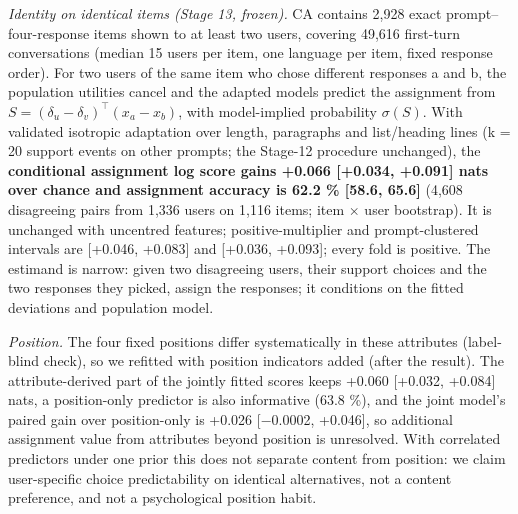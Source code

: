 \documentclass{article}
\begin{document}
\emph{Identity on identical items (Stage 13, frozen).} CA contains 2,928 exact prompt--four-response items shown to at least two users, covering 49,616 first-turn conversations (median 15 users per item, one language per item, fixed response order). For two users of the same item who chose different responses a and b, the population utilities cancel and the adapted models predict the assignment from \(S = (\delta_u - \delta_v)^\top (x_a - x_b)\), with model-implied probability \(\sigma(S)\). With validated isotropic adaptation over length, paragraphs and list/heading lines (k = 20 support events on other prompts; the Stage-12 procedure unchanged), the \textbf{conditional assignment log score gains +0.066 {[}+0.034, +0.091{]} nats over chance and assignment accuracy is 62.2 \% {[}58.6, 65.6{]}} (4,608 disagreeing pairs from 1,336 users on 1,116 items; item $\times$ user bootstrap). It is unchanged with uncentred features; positive-multiplier and prompt-clustered intervals are {[}+0.046, +0.083{]} and {[}+0.036, +0.093{]}; every fold is positive. The estimand is narrow: given two disagreeing users, their support choices and the two responses they picked, assign the responses; it conditions on the fitted deviations and population model.

\emph{Position.} The four fixed positions differ systematically in these attributes (label-blind check), so we refitted with position indicators added (after the result). The attribute-derived part of the jointly fitted scores keeps +0.060 {[}+0.032, +0.084{]} nats, a position-only predictor is also informative (63.8 \%), and the joint model's paired gain over position-only is +0.026 {[}$-$0.0002, +0.046{]}, so additional assignment value from attributes beyond position is unresolved. With correlated predictors under one prior this does not separate content from position: we claim user-specific choice predictability on identical alternatives, not a content preference, and not a psychological position habit.
\end{document}
